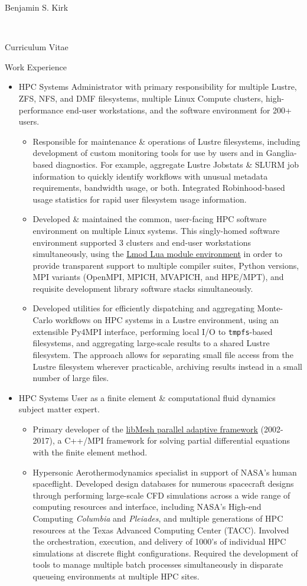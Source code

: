 \documentclass[10pt]{report}
\begin{document}
\begin{cv}{\centerline{\Large Benjamin S. Kirk}\\
    \centerline{\large Curriculum Vitae}}
\begin{cvlist}{Work Experience}
\begin{itemize}
  \item
    HPC Systems Administrator with primary responsibility for multiple Lustre, ZFS, NFS, and DMF filesystems, multiple Linux Compute clusters, high-performance end-user workstations, and the software environment for 200+ users.
    \begin{itemize}
    \item
      Responsible for maintenance \& operations of Lustre filesystems, including development of custom monitoring tools for use by users and in Ganglia-based diagnostics.  For example, aggregate Lustre Jobstats \& SLURM job information to quickly identify workflows with unusual metadata requirements, bandwidth usage, or both.  Integrated Robinhood-based usage statistics for rapid user filesystem usage information.
    \item
      Developed \& maintained the common, user-facing HPC software environment on multiple Linux systems.  This singly-homed software environment supported 3 clusters and end-user workstations simultaneously, using the \href{https://lmod.readthedocs.io/en/latest}{Lmod Lua module environment} in order to provide transparent support to multiple compiler suites, Python versions, MPI variants (OpenMPI, MPICH, MVAPICH, and HPE/MPT), and requisite development library software stacks simultaneously.
    \item
      Developed utilities for efficiently dispatching and aggregating Monte-Carlo workflows on HPC systems in a Lustre environment, using an extensible Py4MPI interface, performing local I/O to \texttt{tmpfs}-based filesystems, and aggregating large-scale results to a shared Lustre filesystem. The approach allows for separating small file access from the Lustre filesystem wherever practicable, archiving results instead in a small number of large files.
    \end{itemize}
  \item
    HPC Systems User as a finite element \& computational fluid dynamics subject matter expert.
    \begin{itemize}
    \item
      Primary developer of the \href{(http://libmesh.github.io)}{libMesh parallel adaptive framework} (2002-2017), a C++/MPI framework for solving partial differential equations with the finite element method.
    \item
      Hypersonic Aerothermodynamics specialist in support of NASA’s human spaceflight. Developed design databases for numerous spacecraft designs through performing large-scale CFD simulations across a wide range of computing resources and interface, including NASA’s High-end Computing \emph{Columbia} and \emph{Pleiades}, and multiple generations of HPC resources at the Texas Advanced Computing Center (TACC).  Involved the orchestration, execution, and delivery of 1000's of individual HPC simulations at discrete flight configurations.  Required the development of tools to manage multiple batch processes simultaneously in disparate queueing environments at multiple HPC sites.

\end{itemize}
\end{itemize}
\end{cvlist}
\end{cv}
\end{document}
